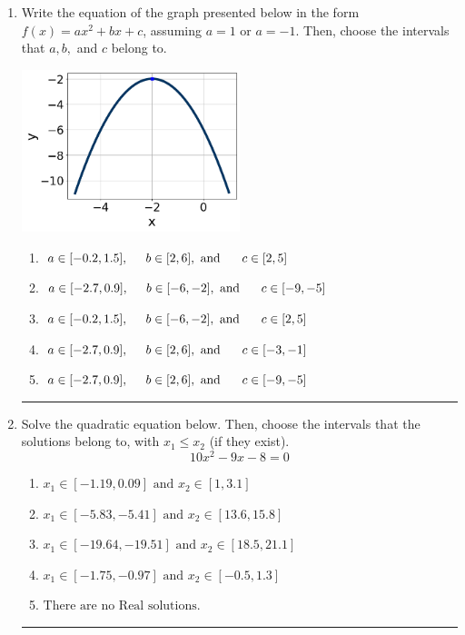 \documentclass[14pt]{extbook}
\newcommand{\litem}[1]{\item#1\hspace*{-1cm}\rule{\textwidth}{0.4pt}}
\begin{document}
\begin{enumerate}
{\begin{enumerate}[label=\Alph*.]
\end{enumerate} }
\litem{
Write the equation of the graph presented below in the form $f(x)=ax^2+bx+c$, assuming  $a=1$ or $a=-1$. Then, choose the intervals that $a, b,$ and $c$ belong to.
\begin{center}
    \includegraphics[width=0.5\textwidth]{../Figures/quadraticGraphToEquationA.png}
\end{center}
\begin{enumerate}[label=\Alph*.]
\item \( a \in [-0.2, 1.5], \hspace*{5mm} b \in [2, 6], \text{ and } \hspace*{5mm} c \in [2, 5] \)
\item \( a \in [-2.7, 0.9], \hspace*{5mm} b \in [-6, -2], \text{ and } \hspace*{5mm} c \in [-9, -5] \)
\item \( a \in [-0.2, 1.5], \hspace*{5mm} b \in [-6, -2], \text{ and } \hspace*{5mm} c \in [2, 5] \)
\item \( a \in [-2.7, 0.9], \hspace*{5mm} b \in [2, 6], \text{ and } \hspace*{5mm} c \in [-3, -1] \)
\item \( a \in [-2.7, 0.9], \hspace*{5mm} b \in [2, 6], \text{ and } \hspace*{5mm} c \in [-9, -5] \)

\end{enumerate} }
\litem{
Solve the quadratic equation below. Then, choose the intervals that the solutions belong to, with $x_1 \leq x_2$ (if they exist).\[ 10x^{2} -9 x -8 = 0 \]\begin{enumerate}[label=\Alph*.]
\item \( x_1 \in [-1.19, 0.09] \text{ and } x_2 \in [1, 3.1] \)
\item \( x_1 \in [-5.83, -5.41] \text{ and } x_2 \in [13.6, 15.8] \)
\item \( x_1 \in [-19.64, -19.51] \text{ and } x_2 \in [18.5, 21.1] \)
\item \( x_1 \in [-1.75, -0.97] \text{ and } x_2 \in [-0.5, 1.3] \)
\item \( \text{There are no Real solutions.} \)


\end{enumerate}}
\end{enumerate}
\end{document}
